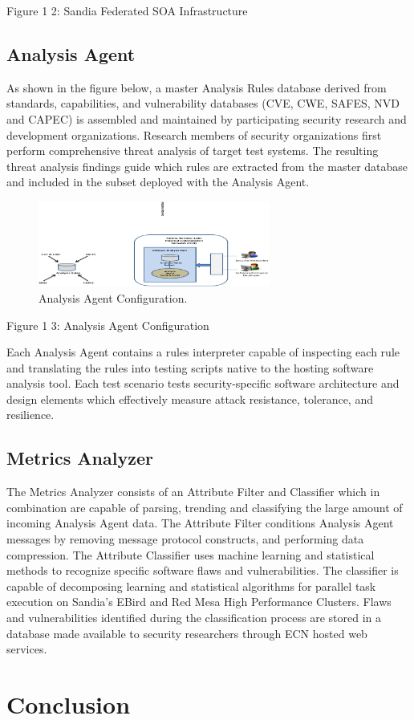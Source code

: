 \documentclass[times, 10pt,twocolumn]{article}
\begin{document}
Figure 1 2: Sandia Federated SOA Infrastructure

\subsection{Analysis Agent}\label{sec:tech:aa}
As shown in the figure below, a master Analysis Rules database derived from standards, capabilities, and vulnerability databases (CVE, CWE, SAFES, NVD and CAPEC) is assembled and maintained by participating security research and development organizations. Research members of security organizations first perform comprehensive threat analysis of target test systems. The resulting threat analysis findings guide which rules are extracted from the master database and included in the subset deployed with the Analysis Agent.
     
\begin{figure}[!t]
\centering
\includegraphics[width=3in]{image007}
\caption{Analysis Agent Configuration.}
\label{fig:aa-config}
\end{figure}  

Figure 1 3: Analysis Agent Configuration

Each Analysis Agent contains a rules interpreter capable of inspecting each rule and translating the rules into testing scripts native to the hosting software analysis tool. Each test scenario tests security-specific software architecture and design elements which effectively measure attack resistance, tolerance, and resilience.

\subsection{Metrics Analyzer}\label{sec:tech:ma}
The Metrics Analyzer consists of an Attribute Filter and Classifier which in combination are capable of parsing, trending and classifying the large amount of incoming Analysis Agent data. The Attribute Filter conditions Analysis Agent messages by removing message protocol constructs, and performing data compression. The Attribute Classifier uses machine learning and statistical methods to recognize specific software flaws and vulnerabilities. The classifier is capable of decomposing learning and statistical algorithms for parallel task execution on Sandia’s EBird and Red Mesa High Performance Clusters. Flaws and vulnerabilities identified during the classification process are stored in a database made available to security researchers through ECN hosted web services. 

\section{Conclusion}




\end{document}
